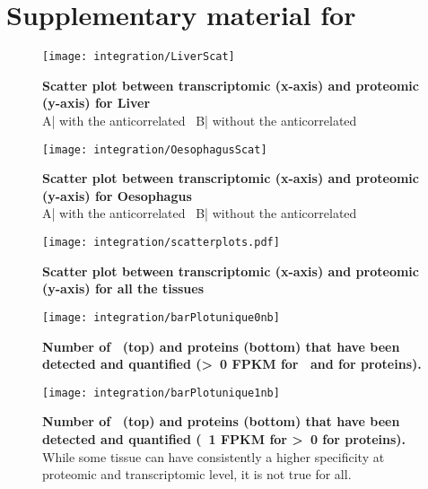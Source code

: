 %
%
\chapter{Supplementary material for}\label{ch:SupplIntegration}

\begin{figure}
    \texttt{[image: integration/LiverScat]}\centering
    \caption[Scatter plot between transcriptomic and proteomic
    for Liver]{\label{fig:ScatterPlotLiver}\textbf{Scatter plot between
    transcriptomic (x-axis) and proteomic (y-axis) for Liver}\\
    A| with the anticorrelated \mRNAs\ B| without the anticorrelated \mRNAs}
\end{figure}


\begin{figure}
\texttt{[image: integration/OesophagusScat]}\centering
    \caption[Scatter plot between transcriptomic and
    proteomic for Oesophagus]{\label{fig:ScatterPlotOesophagus}\textbf{Scatter plot between
    transcriptomic (x-axis) and  proteomic (y-axis) for Oesophagus}\\
    A| with the anticorrelated \mRNAs\ B| without the anticorrelated \mRNAs}
\end{figure}


\begin{figure}
    \texttt{[image: integration/scatterplots.pdf]}\centering
    \caption[Scatter plot between transcriptomic and
    proteomic for all tissues]{\label{fig:ScatterPlotAll}\textbf{Scatter plot between
    transcriptomic (x-axis) and  proteomic (y-axis) for all the tissues}}
\end{figure}


\begin{figure}%
    \texttt{[image: integration/barPlotunique0nb]}\centering
    \caption[Number of \mRNAs\ and proteins detected  only in one
    unique tissue]{\label{fig:barPlotunique0nb}\textbf{Number of
    \mRNAs\ (top) and proteins (bottom)
    that have been detected and quantified (\textgreater\ 0 \gls{FPKM} for \mRNA\
    and for proteins).}}
\end{figure}

\begin{figure}%
    \texttt{[image: integration/barPlotunique1nb]}\centering
    \caption[Number of \mRNAs\ (\geq\ 1 \gls{FPKM})
    and proteins detected (at specific thresholds) only in one unique
    tissue]{\label{fig:barPlotunique1nb}\textbf{Number of
    \mRNAs\ (top) and proteins (bottom)
    that have been detected and quantified (\geq\ 1 \gls{FPKM} for \mRNA\;
    \textgreater\ 0 for proteins).} While some tissue can have consistently a higher
    specificity at proteomic and transcriptomic level, it is not true for all.}
\end{figure}




